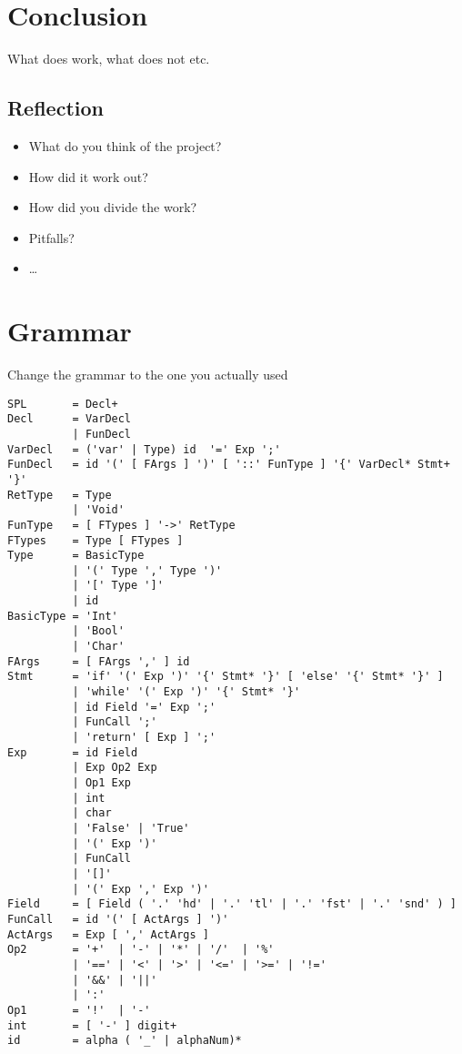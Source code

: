 \documentclass{report}
\begin{document}
\chapter{Conclusion}
What does work, what does not etc.

\section{Reflection}
\begin{itemize}
	\item What do you think of the project?
	\item How did it work out?
	\item How did you divide the work?
	\item Pitfalls?
	\item \ldots
\end{itemize}




\appendix
\chapter{Grammar}
Change the grammar to the one you actually used

\begin{verbatim}
SPL       = Decl+
Decl      = VarDecl
          | FunDecl
VarDecl   = ('var' | Type) id  '=' Exp ';'
FunDecl   = id '(' [ FArgs ] ')' [ '::' FunType ] '{' VarDecl* Stmt+ '}'
RetType   = Type
          | 'Void'
FunType   = [ FTypes ] '->' RetType
FTypes    = Type [ FTypes ]
Type      = BasicType
          | '(' Type ',' Type ')'
          | '[' Type ']'
          | id
BasicType = 'Int'
          | 'Bool'
          | 'Char'
FArgs     = [ FArgs ',' ] id
Stmt      = 'if' '(' Exp ')' '{' Stmt* '}' [ 'else' '{' Stmt* '}' ]
          | 'while' '(' Exp ')' '{' Stmt* '}'
          | id Field '=' Exp ';'
          | FunCall ';'
          | 'return' [ Exp ] ';'
Exp       = id Field
          | Exp Op2 Exp
          | Op1 Exp
          | int
          | char
          | 'False' | 'True'
          | '(' Exp ')'
          | FunCall
          | '[]'
          | '(' Exp ',' Exp ')'
Field     = [ Field ( '.' 'hd' | '.' 'tl' | '.' 'fst' | '.' 'snd' ) ]
FunCall   = id '(' [ ActArgs ] ')'
ActArgs   = Exp [ ',' ActArgs ]
Op2       = '+'  | '-' | '*' | '/'  | '%'
          | '==' | '<' | '>' | '<=' | '>=' | '!='
          | '&&' | '||'
          | ':'
Op1       = '!'  | '-'
int       = [ '-' ] digit+
id        = alpha ( '_' | alphaNum)*
\end{verbatim}
\end{document}
